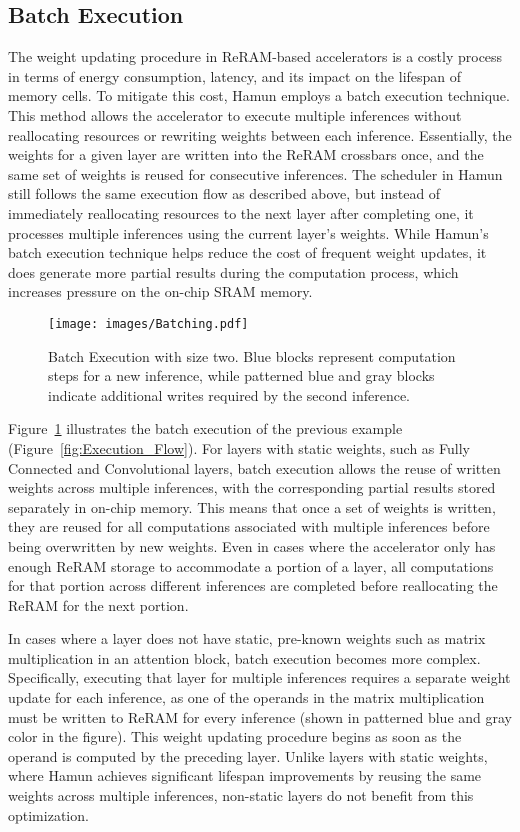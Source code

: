 \subsection{Batch Execution}\label{subs:Batch}
The weight updating procedure in ReRAM-based accelerators is a costly process in terms of energy consumption, latency, and its impact on the lifespan of memory cells. To mitigate this cost, Hamun employs a batch execution technique. This method allows the accelerator to execute multiple inferences without reallocating resources or rewriting weights between each inference. Essentially, the weights for a given layer are written into the ReRAM crossbars once, and the same set of weights is reused for consecutive inferences. The scheduler in Hamun still follows the same execution flow as described above, but instead of immediately reallocating resources to the next layer after completing one, it processes multiple inferences using the current layer's weights. While Hamun’s batch execution technique helps reduce the cost of frequent weight updates, it does generate more partial results during the computation process, which increases pressure on the on-chip SRAM memory.

\begin{figure}[t!]
    \centering
    \texttt{[image: images/Batching.pdf]}
    \vskip -0.10in
    \caption{Batch Execution with size two. Blue blocks represent computation steps for a new inference, while patterned blue and gray blocks indicate additional writes required by the second inference.}
    \label{fig:Batching}
    \vskip -0.25in
\end{figure}

Figure~\ref{fig:Batching} illustrates the batch execution of the previous example (Figure~\ref{fig:Execution_Flow}). For layers with static weights, such as Fully Connected and Convolutional layers, batch execution allows the reuse of written weights across multiple inferences, with the corresponding partial results stored separately in on-chip memory. This means that once a set of weights is written, they are reused for all computations associated with multiple inferences before being overwritten by new weights. Even in cases where the accelerator only has enough ReRAM storage to accommodate a portion of a layer, all computations for that portion across different inferences are completed before reallocating the ReRAM for the next portion.

In cases where a layer does not have static, pre-known weights such as matrix multiplication in an attention block, batch execution becomes more complex. Specifically, executing that layer for multiple inferences requires a separate weight update for each inference, as one of the operands in the matrix multiplication must be written to ReRAM for every inference (shown in patterned blue and gray color in the figure). This weight updating procedure begins as soon as the operand is computed by the preceding layer. Unlike layers with static weights, where Hamun achieves significant lifespan improvements by reusing the same weights across multiple inferences, non-static layers do not benefit from this optimization.

